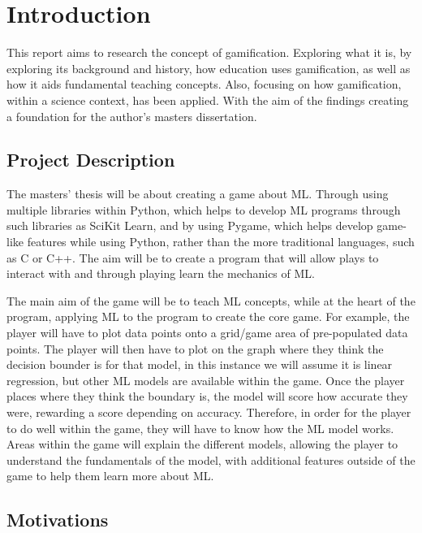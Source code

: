 \chapter{Introduction}
	\label{chap:intro}
	
	This report aims to research the concept of gamification. Exploring what it is, by exploring its background and history, how education uses gamification, as well as how it aids fundamental teaching concepts. Also, focusing on how gamification, within a science context, has been applied. With the aim of the findings creating a foundation for the author’s masters dissertation.
	
	
	\section{Project Description}
		\label{sec:intro_pro_desc} 	
		
		
		The masters' thesis will be about creating a game about \ac{ML}. Through using multiple libraries within Python, which helps to develop \ac{ML} programs through such libraries as SciKit Learn, and by using Pygame, which helps develop game-like features while using Python, rather than the more traditional languages, such as C or C++. The aim will be to create a program that will allow plays to interact with and through playing learn the mechanics of \ac{ML}. 
		
		The main aim of the game will be to teach \ac{ML} concepts, while at the heart of the program, applying \ac{ML} to the program to create the core game. For example, the player will have to plot data points onto a grid/game area of pre-populated data points. The player will then have to plot on the graph where they think the decision bounder is for that model, in this instance we will assume it is linear regression, but other \ac{ML} models are available within the game. Once the player places where they think the boundary is, the model will score how accurate they were, rewarding a score depending on accuracy. Therefore, in order for the player to do well within the game, they will have to know how the \ac{ML} model works. Areas within the game will explain the different models, allowing the player to understand the fundamentals of the model, with additional features outside of the game to help them learn more about \ac{ML}.
		
	\section{Motivations}
		\label{sec:intro_motivation} 
		

